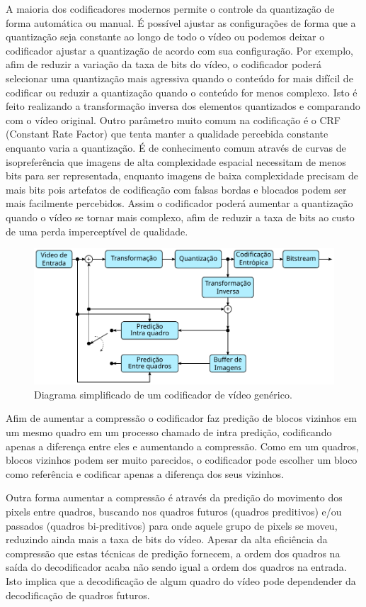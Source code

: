 A maioria dos codificadores modernos permite o controle da quantização de forma automática ou manual. É possível ajustar as configurações de forma que a quantização seja constante ao longo de todo o vídeo ou podemos deixar o codificador ajustar a quantização de acordo com sua configuração. Por exemplo, afim de reduzir a variação da taxa de bits do vídeo, o codificador poderá selecionar uma quantização mais agressiva quando o conteúdo for mais difícil de codificar ou reduzir a quantização quando o conteúdo for menos complexo. Isto é feito realizando a transformação inversa dos elementos quantizados e comparando com o vídeo original. Outro parâmetro muito comum na codificação é o CRF (Constant Rate Factor) que tenta manter a qualidade percebida constante enquanto varia a quantização. É de conhecimento comum através de curvas de isopreferência que imagens de alta complexidade espacial necessitam de menos bits para ser representada, enquanto imagens de baixa complexidade precisam de mais bits pois artefatos de codificação com falsas bordas e blocados podem ser mais facilmente percebidos. Assim o codificador poderá aumentar a quantização quando o vídeo se tornar mais complexo, afim de reduzir a taxa de bits ao custo de uma perda imperceptível de qualidade.

\begin{figure}
	\centering
	\includegraphics[width=0.7\linewidth]{fig/coding}
	\caption{Diagrama simplificado de um codificador de vídeo genérico.}
	\label{fig:coding}
\end{figure}

Afim de aumentar a compressão o codificador faz predição de blocos vizinhos em um mesmo quadro em um processo chamado de intra predição, codificando apenas a diferença entre eles e aumentando a compressão. Como em um quadros, blocos vizinhos podem ser muito parecidos, o codificador pode escolher um bloco como referência e codificar apenas a diferença dos seus vizinhos.

Outra forma aumentar a compressão é através da predição do movimento dos pixels entre quadros, buscando nos quadros futuros (quadros preditivos) e/ou passados (quadros bi-preditivos) para onde aquele grupo de pixels se moveu, reduzindo ainda mais a taxa de bits do vídeo. Apesar da alta eficiência da compressão que estas técnicas de predição fornecem, a ordem dos quadros na saída do decodificador acaba não sendo igual a ordem dos quadros na entrada. Isto implica que a decodificação de algum quadro do vídeo pode dependender da decodificação de quadros futuros.

